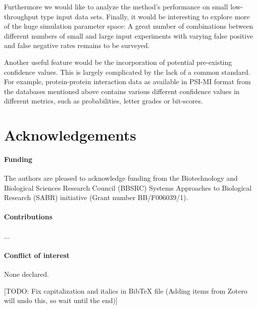 \documentclass{bioinfo}
\newcommand{\note}[1]{{\color{red}[#1]}}
\begin{document}
Furthermore we would like to analyze the method's performance on small low-throughput type input data sets. Finally, it would be interesting to explore more of the huge simulation parameter space: A great number of combinations between different numbers of small and large input experiments with varying false positive and false negative rates remains to be surveyed.

Another useful feature would be the incorporation of potential pre-existing confidence values. This is largely complicated by the lack of a common standard. For example, protein-protein interaction data as available in PSI-MI format from the databases mentioned above contains various different confidence values in different metrics, such as probabilities, letter grades or bit-scores.

\section*{Acknowledgements}

\paragraph{Funding\textcolon} The authors are pleased to acknowledge funding from the Biotechnology and Biological Sciences Research Council (BBSRC) Systems Approaches to Biological Research (SABR) initiative (Grant number BB/F006039/1). 

\paragraph{Contributions\textcolon} ...

\paragraph{Conflict of interest\textcolon} None declared.





\note{TODO: Fix capitalization and italics in BibTeX file (Adding items from Zotero will undo this, so wait until the end)}
\end{document}
